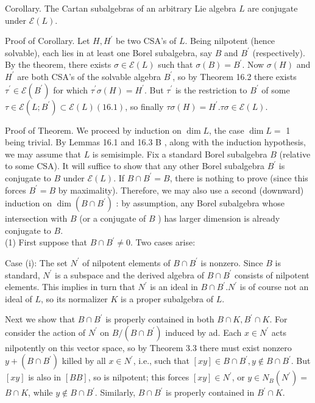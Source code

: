 \documentclass[10pt]{article}
\begin{document}
Corollary. The Cartan subalgebras of an arbitrary Lie algebra $L$ are conjugate under $\mathscr{E}(L)$.

Proof of Corollary. Let $H, H^{\prime}$ be two CSA's of $L$. Being nilpotent (hence solvable), each lies in at least one Borel subalgebra, say $B$ and $B^{\prime}$ (respectively). By the theorem, there exists $\sigma \in \mathscr{E}(L)$ such that $\sigma(B)=B^{\prime}$. Now $\sigma(H)$ and $H^{\prime}$ are both CSA's of the solvable algebra $B^{\prime}$, so by Theorem 16.2 there exists $\tau^{\prime} \in \mathscr{E}\left(B^{\prime}\right)$ for which $\tau^{\prime} \sigma(H)=H^{\prime}$. But $\tau^{\prime}$ is the restriction to $B^{\prime}$ of some $\tau \in \mathscr{E}\left(L ; B^{\prime}\right) \subset \mathscr{E}(L)(16.1)$, so finally $\tau \sigma(H)=H^{\prime} . \tau \sigma \in \mathscr{E}(L)$.

Proof of Theorem. We proceed by induction on $\operatorname{dim} L$, the case $\operatorname{dim} L=$ 1 being trivial. By Lemmas 16.1 and 16.3 B , along with the induction hypothesis, we may assume that $L$ is semisimple. Fix a standard Borel subalgebra $B$ (relative to some CSA). It will suffice to show that any other Borel subalgebra $B^{\prime}$ is conjugate to $B$ under $\mathscr{E}(L)$. If $B \cap B^{\prime}=B$, there is nothing to prove (since this forces $B^{\prime}=B$ by maximality). Therefore, we may also use a second (downward) induction on $\operatorname{dim}\left(B \cap B^{\prime}\right)$ : by assumption, any Borel subalgebra whose intersection with $B$ (or a conjugate of $B$ ) has larger dimension is already conjugate to $B$.\\
(1) First suppose that $B \cap B^{\prime} \neq 0$. Two cases arise:

Case (i): The set $N^{\prime}$ of nilpotent elements of $B \cap B^{\prime}$ is nonzero. Since $B$ is standard, $N^{\prime}$ is a subspace and the derived algebra of $B \cap B^{\prime}$ consists of nilpotent elements. This implies in turn that $N^{\prime}$ is an ideal in $B \cap B^{\prime} . N^{\prime}$ is of course not an ideal of $L$, so its normalizer $K$ is a proper subalgebra of $L$.

Next we show that $B \cap B^{\prime}$ is properly contained in both $B \cap K, B^{\prime} \cap K$. For consider the action of $N^{\prime}$ on $B /\left(B \cap B^{\prime}\right)$ induced by ad. Each $x \in N^{\prime}$ acts nilpotently on this vector space, so by Theorem 3.3 there must exist nonzero $y+\left(B \cap B^{\prime}\right)$ killed by all $x \in N^{\prime}$, i.e., such that $[x y] \in B \cap B^{\prime}, y \notin B \cap B^{\prime}$. But $[x y]$ is also in $[B B]$, so is nilpotent; this forces $[x y] \in N^{\prime}$, or $y \in N_{B}\left(N^{\prime}\right)=$ $B \cap K$, while $y \notin B \cap B^{\prime}$. Similarly, $B \cap B^{\prime}$ is properly contained in $B^{\prime} \cap K$.
\end{document}
